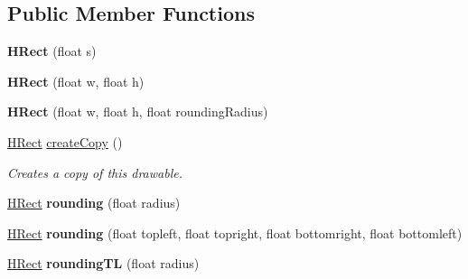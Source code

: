 \subsection*{Public Member Functions}
\begin{DoxyCompactItemize}
\item 
\hypertarget{classhype_1_1drawable_1_1_h_rect_a919b2296fa3e20e697beab3793991b61}{{\bfseries H\-Rect} (float s)}\label{classhype_1_1drawable_1_1_h_rect_a919b2296fa3e20e697beab3793991b61}

\item 
\hypertarget{classhype_1_1drawable_1_1_h_rect_a2d8a05687abe254f2f3acc00c07a315c}{{\bfseries H\-Rect} (float w, float h)}\label{classhype_1_1drawable_1_1_h_rect_a2d8a05687abe254f2f3acc00c07a315c}

\item 
\hypertarget{classhype_1_1drawable_1_1_h_rect_ad54b4ba53618a7cca904ab7655344b12}{{\bfseries H\-Rect} (float w, float h, float rounding\-Radius)}\label{classhype_1_1drawable_1_1_h_rect_ad54b4ba53618a7cca904ab7655344b12}

\item 
\hyperlink{classhype_1_1drawable_1_1_h_rect}{H\-Rect} \hyperlink{classhype_1_1drawable_1_1_h_rect_a0a7755f887098c94cff922e8230cad65}{create\-Copy} ()
\begin{DoxyCompactList}\small\item\em Creates a copy of this drawable. \end{DoxyCompactList}\item 
\hypertarget{classhype_1_1drawable_1_1_h_rect_a603f506e1589c28db3f0a95d20cdd939}{\hyperlink{classhype_1_1drawable_1_1_h_rect}{H\-Rect} {\bfseries rounding} (float radius)}\label{classhype_1_1drawable_1_1_h_rect_a603f506e1589c28db3f0a95d20cdd939}

\item 
\hypertarget{classhype_1_1drawable_1_1_h_rect_a8f58251d67b64ad7b6303281cfbb0b0f}{\hyperlink{classhype_1_1drawable_1_1_h_rect}{H\-Rect} {\bfseries rounding} (float topleft, float topright, float bottomright, float bottomleft)}\label{classhype_1_1drawable_1_1_h_rect_a8f58251d67b64ad7b6303281cfbb0b0f}

\item 
\hypertarget{classhype_1_1drawable_1_1_h_rect_a161506ef0aa92d72dfac64a03f754c78}{\hyperlink{classhype_1_1drawable_1_1_h_rect}{H\-Rect} {\bfseries rounding\-T\-L} (float radius)}\label{classhype_1_1drawable_1_1_h_rect_a161506ef0aa92d72dfac64a03f754c78}


\end{DoxyCompactItemize}
